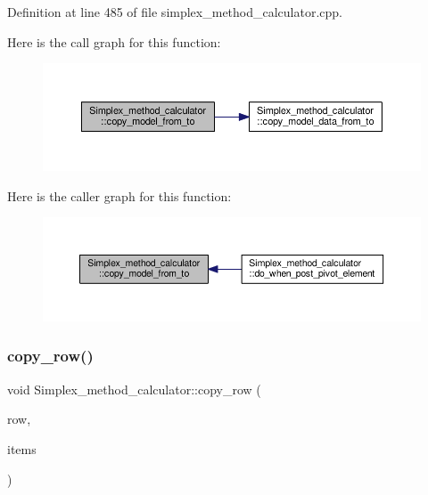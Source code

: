 Definition at line 485 of file simplex\+\_\+method\+\_\+calculator.\+cpp.

Here is the call graph for this function\+:\nopagebreak
\begin{figure}[H]
\begin{center}
\leavevmode
\includegraphics[width=350pt]{classSimplex__method__calculator_a7a90111baf326f1146e85b009b6ef304_cgraph}
\end{center}
\end{figure}
Here is the caller graph for this function\+:\nopagebreak
\begin{figure}[H]
\begin{center}
\leavevmode
\includegraphics[width=350pt]{classSimplex__method__calculator_a7a90111baf326f1146e85b009b6ef304_icgraph}
\end{center}
\end{figure}
\mbox{\label{classSimplex__method__calculator_ae0e222fe5b32041564b8202f0d6c33a1}} 
\subsubsection{\texorpdfstring{copy\+\_\+row()}{copy\_row()}}
{\footnotesize\ttfamily void Simplex\+\_\+method\+\_\+calculator\+::copy\+\_\+row (\begin{DoxyParamCaption}\item[{int}]{row,  }\item[{Q\+List$<$ Q\+Standard\+Item $\ast$$>$}]{items }\end{DoxyParamCaption})\hspace{0.3cm}{\ttfamily [private]}}



